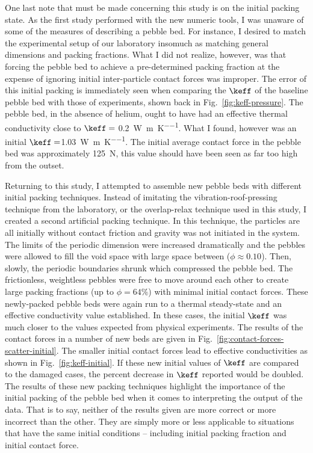 One last note that must be made concerning this study is on the initial packing state. As the first study performed with the new numeric tools, I was unaware of some of the measures of describing a pebble bed. For instance, I desired to match the experimental setup of our laboratory insomuch as matching general dimensions and packing fractions. What I did not realize, however, was that forcing the pebble bed to achieve a pre-determined packing fraction at the expense of ignoring initial inter-particle contact forces was improper. The error of this initial packing is immediately seen when comparing the $\keff$ of the baseline pebble bed with those of experiments, shown back in Fig.~\ref{fig:keff-pressure}. The pebble bed, in the absence of helium, ought to have had an effective thermal conductivity close to $\keff =$ \SI{0.2}{\watt\per\meter\per\kelvin}. What I found, however was an initial $\keff = $\SI{1.03}{\watt\per\meter\per\kelvin}. The initial average contact force in the pebble bed was approximately \SI{125}{N}, this value should have been seen as far too high from the outset.

Returning to this study, I attempted to assemble new pebble beds with different initial packing techniques. Instead of imitating the vibration-roof-pressing technique from the laboratory, or the overlap-relax technique used in this study, I created a second artificial packing technique. In this technique, the particles are all initially without contact friction and gravity was not initiated in the system. The limits of the periodic dimension were increased dramatically and the pebbles were allowed to fill the void space with large space between ($\phi \approx 0.10$). Then, slowly, the periodic boundaries shrunk which compressed the pebble bed. The frictionless, weightless pebbles were free to move around each other to create large packing fractions (up to $\phi = 64\%$) with minimal initial contact forces. These newly-packed pebble beds were again run to a thermal steady-state and an effective conductivity value established. In these cases, the initial $\keff$ was much closer to the values expected from physical experiments. The results of the contact forces in a number of new beds are given in Fig.~\ref{fig:contact-forces-scatter-initial}. The smaller initial contact forces lead to effective conductivities as shown in Fig.~\ref{fig:keff-initial}. If these new initial values of $\keff$ are compared to the damaged cases, the percent decrease in $\keff$ reported would be doubled. The results of these new packing techniques highlight the importance of the initial packing of the pebble bed when it comes to interpreting the output of the data. That is to say, neither of the results given are more correct or more incorrect than the other. They are simply more or less applicable to situations that have the same initial conditions -- including initial packing fraction and initial contact force.

